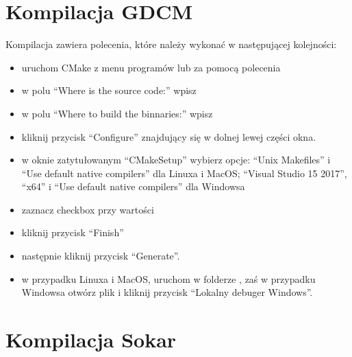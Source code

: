 \section{Kompilacja GDCM}

Kompilacja zawiera polecenia, które należy wykonać w następującej kolejności:
\begin{itemize}
    \item uruchom CMake z menu programów lub za pomocą polecenia 
    \item w polu \enquote{Where is the source code:} wpisz 
    \item w polu \enquote{Where to build the binnaries:} wpisz 
    \item kliknij przycisk \enquote{Configure} znajdujący się w dolnej lewej części okna.
    \item w oknie zatytułowanym \enquote{CMakeSetup} wybierz opcje: \enquote{Unix Makefiles} i \enquote{Use default native compilers} dla Linuxa i MacOS; \enquote{Visual Studio 15 2017}, \enquote{x64} i \enquote{Use default native compilers} dla Windowsa
    \item zaznacz checkbox przy wartości 
    \item kliknij przycisk \enquote{Finish}
    \item następnie kliknij przycisk \enquote{Generate}.
    \item w przypadku Linuxa i MacOS, uruchom  w folderze , zaś w przypadku Windowsa otwórz plik  i kliknij przycisk \enquote{Lokalny debuger Windows}.
\end{itemize}

\section{Kompilacja Sokar}

